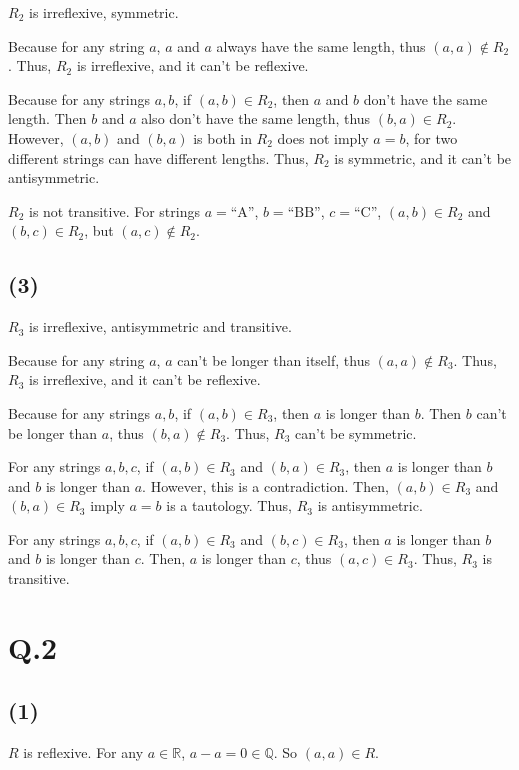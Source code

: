 \documentclass[a4paper,12pt]{article}
\begin{document}
$R_2$ is irreflexive, symmetric.

Because for any string $a$, $a$ and $a$ always have the same length, thus $(a, a) \not\in R_2$.
Thus, $R_2$ is irreflexive, and it can't be reflexive.

Because for any strings $a, b$, if $(a, b) \in R_2$, then $a$ and $b$ don't have the same length.
Then $b$ and $a$ also don't have the same length, thus $(b, a) \in R_2$.
However, $(a,b)$ and $(b,a)$ is both in $R_2$ does not imply $a = b$, for two different strings can have different lengths.
Thus, $R_2$ is symmetric, and it can't be antisymmetric.

$R_2$ is not transitive.
For strings $a = \text{``A''}$, $b = \text{``BB''}$, $c = \text{``C''}$, $(a, b) \in R_2$ and $(b, c) \in R_2$, but $(a, c) \not\in R_2$.

\subsection*{(3)}

$R_3$ is irreflexive, antisymmetric and transitive.

Because for any string $a$, $a$ can't be longer than itself, thus $(a, a) \not\in R_3$.
Thus, $R_3$ is irreflexive, and it can't be reflexive.

Because for any strings $a, b$, if $(a, b) \in R_3$, then $a$ is longer than $b$.
Then $b$ can't be longer than $a$, thus $(b, a) \not\in R_3$.
Thus, $R_3$ can't be symmetric.

For any strings $a, b, c$, if $(a, b) \in R_3$ and $(b, a) \in R_3$, then $a$ is longer than $b$ and $b$ is longer than $a$.
However, this is a contradiction.
Then, $(a, b) \in R_3$ and $(b, a) \in R_3$ imply $a = b$ is a tautology.
Thus, $R_3$ is antisymmetric.

For any strings $a, b, c$, if $(a, b) \in R_3$ and $(b, c) \in R_3$, then $a$ is longer than $b$ and $b$ is longer than $c$.
Then, $a$ is longer than $c$, thus $(a, c) \in R_3$.
Thus, $R_3$ is transitive.

\section*{Q.2}

\subsection*{(1)}

$R$ is reflexive. 
For any $a \in \mathbb{R}$, $a - a = 0 \in \mathbb{Q}$. 
So $(a, a) \in R$.
\end{document}
